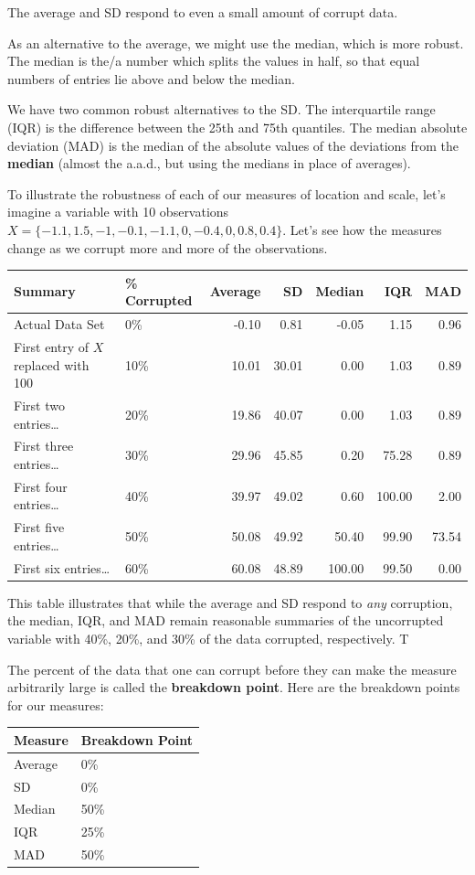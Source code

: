 \documentclass[]{book}
\begin{document}
The average and SD respond to even a small amount of corrupt data.

As an alternative to the average, we might use the median, which is more robust. The median is the/a number which splits the values in half, so that equal numbers of entries lie above and below the median.

We have two common robust alternatives to the SD. The interquartile range (IQR) is the difference between the 25th and 75th quantiles. The median absolute deviation (MAD) is the median of the absolute values of the deviations from the \textbf{median} (almost the a.a.d., but using the medians in place of averages).

To illustrate the robustness of each of our measures of location and scale, let's imagine a variable with 10 observations \(X = \{-1.1, 1.5, -1, -0.1, -1.1, 0, -0.4, 0, 0.8, 0.4\}\). Let's see how the measures change as we corrupt more and more of the observations.

\begin{longtable}[]{@{}llrrrrr@{}}
\toprule
Summary & \% Corrupted & Average & SD & Median & IQR & MAD\tabularnewline
\midrule
\endhead
Actual Data Set & 0\% & -0.10 & 0.81 & -0.05 & 1.15 & 0.96\tabularnewline
First entry of \(X\) replaced with 100 & 10\% & 10.01 & 30.01 & 0.00 & 1.03 & 0.89\tabularnewline
First two entries\ldots{} & 20\% & 19.86 & 40.07 & 0.00 & 1.03 & 0.89\tabularnewline
First three entries\ldots{} & 30\% & 29.96 & 45.85 & 0.20 & 75.28 & 0.89\tabularnewline
First four entries\ldots{} & 40\% & 39.97 & 49.02 & 0.60 & 100.00 & 2.00\tabularnewline
First five entries\ldots{} & 50\% & 50.08 & 49.92 & 50.40 & 99.90 & 73.54\tabularnewline
First six entries\ldots{} & 60\% & 60.08 & 48.89 & 100.00 & 99.50 & 0.00\tabularnewline
\bottomrule
\end{longtable}

This table illustrates that while the average and SD respond to \emph{any} corruption, the median, IQR, and MAD remain reasonable summaries of the uncorrupted variable with 40\%, 20\%, and 30\% of the data corrupted, respectively. T

The percent of the data that one can corrupt before they can make the measure arbitrarily large is called the \textbf{breakdown point}. Here are the breakdown points for our measures:

\begin{longtable}[]{@{}ll@{}}
\toprule
Measure & Breakdown Point\tabularnewline
\midrule
\endhead
Average & 0\%\tabularnewline
SD & 0\%\tabularnewline
Median & 50\%\tabularnewline
IQR & 25\%\tabularnewline
MAD & 50\%\tabularnewline
\bottomrule
\end{longtable}
\end{document}
